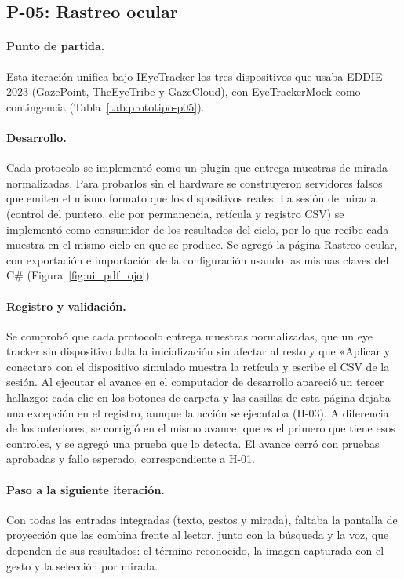 \subsection{P-05: Rastreo ocular}
\label{sec:it_p05}

\paragraph{Punto de partida.} Esta iteración unifica bajo IEyeTracker los tres dispositivos que usaba EDDIE-2023 (GazePoint, TheEyeTribe y GazeCloud), con EyeTrackerMock como contingencia (Tabla~\ref{tab:prototipo-p05}).



\paragraph{Desarrollo.} Cada protocolo se implementó como un plugin que entrega muestras de mirada normalizadas. Para probarlos sin el hardware se construyeron servidores falsos que emiten el mismo formato que los dispositivos reales. La sesión de mirada (control del puntero, clic por permanencia, retícula y registro CSV) se implementó como consumidor de los resultados del ciclo, por lo que recibe cada muestra en el mismo ciclo en que se produce. Se agregó la página Rastreo ocular, con exportación e importación de la configuración usando las mismas claves del C\# (Figura~\ref{fig:ui_pdf_ojo}).

\paragraph{Registro y validación.} Se comprobó que cada protocolo entrega muestras normalizadas, que un eye tracker sin dispositivo falla la inicialización sin afectar al resto y que «Aplicar y conectar» con el dispositivo simulado muestra la retícula y escribe el CSV de la sesión. Al ejecutar el avance en el computador de desarrollo apareció un tercer hallazgo: cada clic en los botones de carpeta y las casillas de esta página dejaba una excepción en el registro, aunque la acción se ejecutaba (H-03). A diferencia de los anteriores, se corrigió en el mismo avance, que es el primero que tiene esos controles, y se agregó una prueba que lo detecta. El avance cerró con \PCincoPruebas{} pruebas aprobadas y \PCincoXfail{} fallo esperado, correspondiente a H-01.

\paragraph{Paso a la siguiente iteración.} Con todas las entradas integradas (texto, gestos y mirada), faltaba la pantalla de proyección que las combina frente al lector, junto con la búsqueda y la voz, que dependen de sus resultados: el término reconocido, la imagen capturada con el gesto y la selección por mirada.

